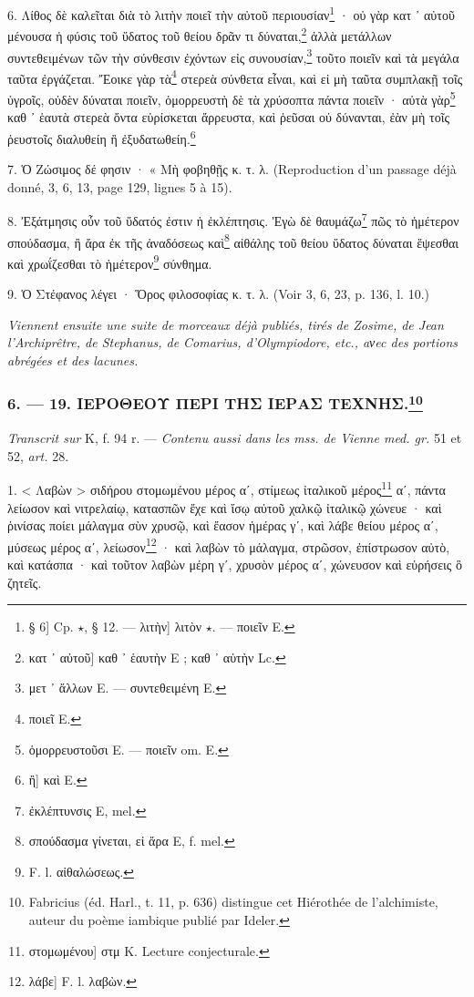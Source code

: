 \documentclass[a4paper, 11pt, oneside, polutonikogreek, french]{article}
\begin{document}
6. Λίθος δὲ καλεῖται διὰ τὸ λιτὴν ποιεῖ τὴν αὐτοῦ περιουσίαν\footnote{§ 6] Cp. $\star$, § 12. --- λιτὴν] λιτὸν $\star$. --- ποιεῖν E.} · οὐ γὰρ κατ ᾽ αὐτοῦ μένουσα ἡ φύσις τοῦ ὕδατος τοῦ θείου δρᾶν τι δύναται,\footnote{κατ ᾽ αὐτοῦ] καθ ᾽ ἑαυτὴν E ; καθ ᾽ αὑτὴν Lc.} ἀλλὰ μετάλλων συντεθειμένων τῶν τὴν σύνθεσιν ἐχόντων εἰς συνουσίαν,\footnote{μετ ᾽ ἄλλων E. --- συντεθειμένη E.} τοῦτο ποιεῖν καὶ τὰ μεγάλα ταῦτα ἐργάζεται. Ἔοικε γὰρ τὰ\footnote{ποιεῖ E.} στερεὰ σύνθετα εἶναι, καὶ εἰ μὴ ταῦτα συμπλακῇ τοῖς ὑγροῖς, οὐδὲν δύναται ποιεῖν, ὁμορρευστὴ δὲ τὰ χρύσοπτα πάντα ποιεῖν · αὐτὰ γὰρ\footnote{ὁμορρευστοῦσι E. --- ποιεῖν om. E.} καθ ᾽ ἑαυτὰ στερεὰ ὄντα εὑρίσκεται ἄρρευστα, καὶ ῥεῦσαι οὐ δύνανται, ἐὰν μὴ τοῖς ῥευστοῖς διαλυθείη ἢ ἐξυδατωθείη.\footnote{ἢ] καὶ E.}

7. Ὁ Ζώσιμος δέ φησιν · « Μὴ φοβηθῇς κ. τ. λ. (Reproduction d'un passage déjà donné, 3, 6, 13, page 129, lignes 5 à 15).

8. Ἐξάτμησις οὖν τοῦ ὕδατός ἐστιν ἡ ἐκλέπτησις. Ἐγὼ δὲ θαυμάζω\footnote{ἐκλέπτυνσις E, mel.} πῶς τὸ ἡμέτερον σπούδασμα, ἢ ἄρα ἐκ τῆς ἀναδόσεως καὶ\footnote{σπούδασμα γίνεται, εἰ ἄρα E, f. mel.} αἰθάλης τοῦ θείου ὕδατος δύναται ἕψεσθαι καὶ χρωΐζεσθαι τὸ ἡμέτερον\footnote{F. l. αἰθαλώσεως.} σύνθημα.

9. Ὁ Στέφανος λέγει · Ὅρος φιλοσοφίας κ. τ. λ. (Voir 3, 6, 23, p. 136, l. 10.)

\emph{Viennent ensuite une suite de morceaux déjà publiés, tirés de Zosime, de Jean l'Archiprêtre, de Stephanus, de Comarius, d'Olympiodore, etc., aνec des portions abrégées et des lacunes.}

\bigskip
\centerline{\EightStarTaper}
\centerline{\EightStarTaper\EightStarTaper}
\bigskip

\subsubsection[6. --- 19. ΙΕΡΟΘΕΟΥ ΠΕΡΙ ΤΗΣ ΙΕΡΑΣ ΤΕΧΝΗΣ.]{6. --- 19. ΙΕΡΟΘΕΟΥ ΠΕΡΙ ΤΗΣ ΙΕΡΑΣ ΤΕΧΝΗΣ.\footnote{Fabricius (éd. Harl., t. 11, p. 636) distingue cet Hiérothée de l'alchimiste, auteur du poème iambique publié par Ideler.}}

\emph{Transcrit sur} K, f. 94 r. --- \emph{Contenu aussi dans les mss. de Vienne med. gr.} 51 et 52, \emph{art.} 28.

\bigskip

1. < Λαβὼν > σιδήρου στομωμένου μέρος αʹ, στίμεως ἰταλικοῦ μέρος\footnote{στομωμένου] στμ K. Lecture conjecturale.} αʹ, πάντα λείωσον καὶ νιτρελαίῳ, κατασπῶν ἔχε καὶ ἴσῳ αὐτοῦ χαλκῷ ἰταλικῷ χώνευε · καὶ ῥινίσας ποίει μάλαγμα σὺν χρυσῷ, καὶ ἔασον ἡμέρας γʹ, καὶ λάβε θείου μέρος αʹ, μύσεως μέρος αʹ, λείωσον\footnote{λάβε] F. l. λαβὼν.} · καὶ λαβὼν τὸ μάλαγμα, στρῶσον, ἐπίστρωσον αὐτὸ, καὶ κατάσπα · καὶ τοῦτον λαβὼν μέρη γʹ, χρυσὸν μέρος αʹ, χώνευσον καὶ εὑρήσεις ὃ ζητεῖς.
\end{document}
